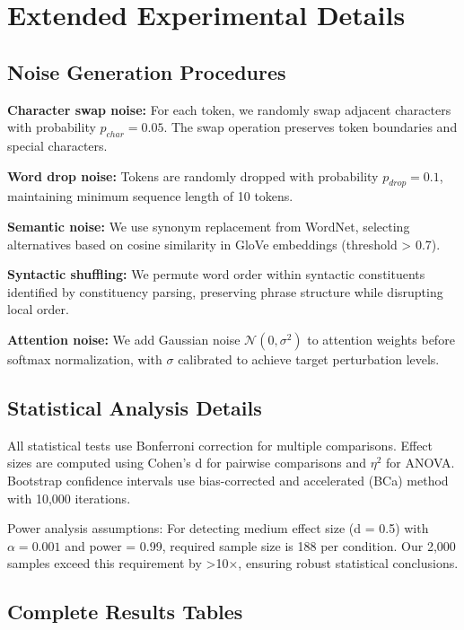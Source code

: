 \documentclass{article}
\begin{document}



\appendix

\section{Extended Experimental Details}
\label{app:details}

\subsection{Noise Generation Procedures}

\textbf{Character swap noise:} For each token, we randomly swap adjacent characters with probability $p_{char}=0.05$. The swap operation preserves token boundaries and special characters.

\textbf{Word drop noise:} Tokens are randomly dropped with probability $p_{drop}=0.1$, maintaining minimum sequence length of 10 tokens.

\textbf{Semantic noise:} We use synonym replacement from WordNet, selecting alternatives based on cosine similarity in GloVe embeddings (threshold > 0.7).

\textbf{Syntactic shuffling:} We permute word order within syntactic constituents identified by constituency parsing, preserving phrase structure while disrupting local order.

\textbf{Attention noise:} We add Gaussian noise $\mathcal{N}(0, \sigma^2)$ to attention weights before softmax normalization, with $\sigma$ calibrated to achieve target perturbation levels.

\subsection{Statistical Analysis Details}

All statistical tests use Bonferroni correction for multiple comparisons. Effect sizes are computed using Cohen's d for pairwise comparisons and $\eta^2$ for ANOVA. Bootstrap confidence intervals use bias-corrected and accelerated (BCa) method with 10,000 iterations.

Power analysis assumptions: For detecting medium effect size (d = 0.5) with $\alpha = 0.001$ and power = 0.99, required sample size is 188 per condition. Our 2,000 samples exceed this requirement by >10×, ensuring robust statistical conclusions.

\subsection{Complete Results Tables}
\end{document}
